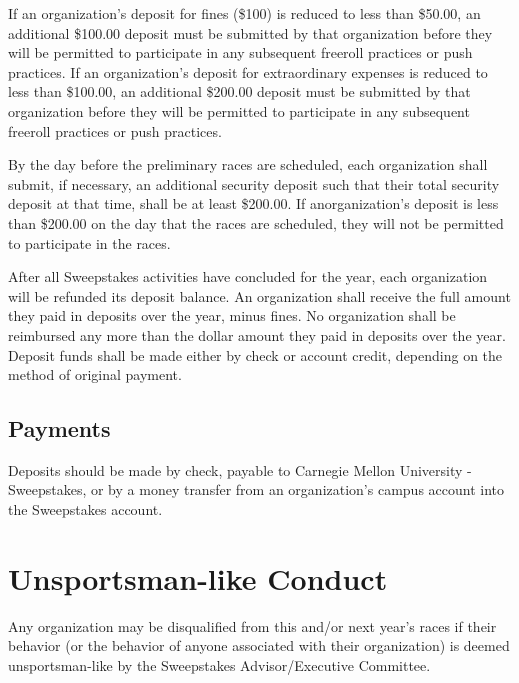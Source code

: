 If an organization's deposit for fines (\$100) is reduced to less than \$50.00, an additional \$100.00 deposit must be submitted by that organization before they will be permitted to participate in any subsequent freeroll practices or push practices. If an organization's deposit for extraordinary expenses is reduced to less than \$100.00, an additional \$200.00 deposit must be submitted by that organization before they will be permitted to participate in any subsequent freeroll practices or push practices.

By the day before the preliminary races are scheduled, each organization shall submit, if necessary, an additional security deposit such that their total security deposit at that time, shall be at least \$200.00. If anorganization's deposit is less than \$200.00 on the day that the races are scheduled, they will not be permitted to participate in the races.

After all Sweepstakes activities have concluded for the year, each organization will be refunded its deposit balance. An organization shall receive the full amount they paid in deposits over the year, minus fines. No organization shall be reimbursed any more than the dollar amount they paid in deposits over the year. Deposit funds shall be made either by check or account credit, depending on the method of original payment.

\subsection{Payments}
Deposits should be made by check, payable to Carnegie Mellon University - Sweepstakes, or by a money transfer from an organization's campus account into the Sweepstakes account.

\section{Unsportsman-like Conduct}
Any organization may be disqualified from this and/or next year's races if their behavior (or the behavior of anyone associated with their organization) is deemed unsportsman-like by the Sweepstakes Advisor/Executive Committee.


